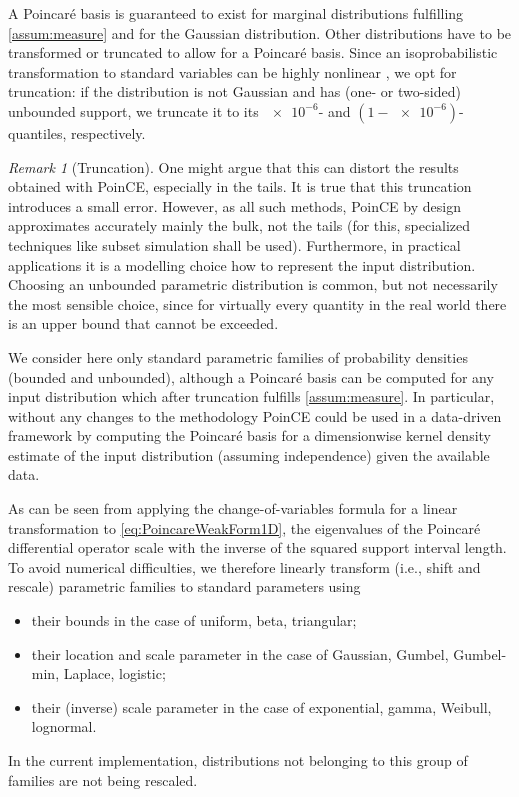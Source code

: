 \documentclass[a4paper,11pt]{article}
\renewcommand{\citep}[2][]{\cite[#1]{#2}}
\theoremstyle{definition}
\theoremstyle{remark}
\newtheorem{rem}{Remark}
\theoremstyle{theorem}
\begin{document}
A Poincar\'e basis is guaranteed to exist for marginal distributions fulfilling \cref{assum:measure} and for the Gaussian distribution. 
Other distributions have to be transformed or truncated to allow for a Poincar\'e basis. Since an isoprobabilistic transformation to standard variables can be highly nonlinear \citep{TorreJCP2019,Oladyshkin2012},
we opt for truncation:
if the distribution is not Gaussian and has (one- or two-sided) unbounded support, we truncate it to its $\num{e-6}$- and $(1-\num{e-6})$-quantiles, respectively.%

\begin{rem}[Truncation]
	One might argue that this can distort the results obtained with PoinCE, especially in the tails. It is true that this truncation introduces a small error. However, as all such methods, PoinCE by design approximates accurately mainly the bulk, not the tails (for this, specialized techniques like subset simulation shall be used). Furthermore, in practical applications it is a modelling choice how to represent the input distribution. Choosing an unbounded parametric distribution is common, but not necessarily the most sensible choice, since for virtually every quantity in the real world there is an upper bound that cannot be exceeded.
\end{rem}

We consider here only standard parametric families of probability densities (bounded and unbounded), although a Poincar\'e basis can be computed for any input distribution which after truncation fulfills \cref{assum:measure}. In particular, without any changes to the methodology PoinCE could be used in a data-driven framework \citep{TorreJCP2019} by computing the Poincar\'e basis for a dimensionwise kernel density estimate of the input distribution  (assuming independence) given the available data.


As can be seen from applying the change-of-variables formula for a linear transformation to \eqref{eq:PoincareWeakForm1D}, the eigenvalues of the Poincar\'e differential operator scale with the inverse of the squared support interval length. To avoid numerical difficulties, we therefore linearly transform (i.e., shift and rescale) parametric families to standard parameters using
\begin{itemize}[itemsep=0pt, parsep=0pt,topsep=0pt]
	\item their bounds in the case of uniform, beta, triangular;
	\item their location and scale parameter in the case of Gaussian, Gumbel, Gumbel-min, Laplace, logistic;
	\item their (inverse) scale parameter in the case of exponential, gamma, Weibull, lognormal.
\end{itemize}
In the current implementation, distributions not belonging to this group of families are not being rescaled. 
\end{document}
